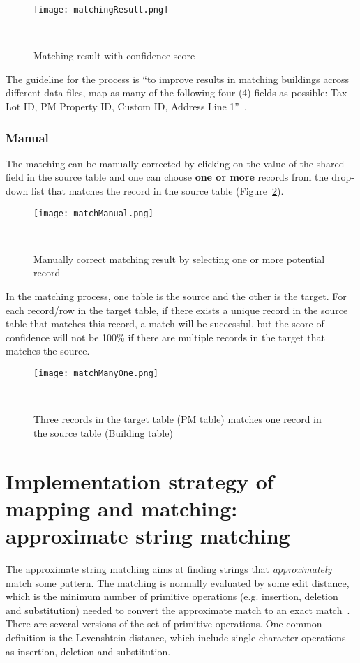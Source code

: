 \documentclass[12pt]{article}
\newcommand{\fref}[1]{Figure~\ref{#1}}
\begin{document}
\begin{figure}[h!]
  \centering
  \texttt{[image: matchingResult.png]}
  \caption{Matching result with confidence
    score}~\cite{SEEDWebpage2015}
  \label{fig:matchingResult}
\end{figure}

The guideline for the process is ``to improve results in matching
buildings across different data files, map as many of the following
four (4) fields as possible: Tax Lot ID, PM Property ID, Custom ID,
Address Line 1''~\cite{SEEDWebpage2015}.

\subsubsection{Manual}
The matching can be manually corrected by clicking on the value of the
shared field in the source table and one can choose \textbf{one or
  more} records from the drop-down list that matches the record in the
source table (\fref{fig:matchManual}).

\begin{figure}[h!]
  \centering
  \texttt{[image: matchManual.png]}
  \caption{Manually correct matching result by selecting one or more
    potential record}~\cite{SEEDWebpage2015}
  \label{fig:matchManual}
\end{figure}

In the matching process, one table is the source and the other is the
target. For each record/row in the target table, if there exists a
unique record in the source table that matches this record, a match
will be successful, but the score of confidence will not be 100\% if
there are multiple records in the target that matches the source.

\begin{figure}[h!]
  \centering
  \texttt{[image: matchManyOne.png]}
  \caption{Three records in the target table (PM table) matches one
    record in the source table (Building table)}~\cite{SEEDWebpage2015}
  \label{fig:matchManyOne}
\end{figure}

\section{Implementation strategy of mapping and matching: approximate
  string matching}
The approximate string matching aims at finding strings that
\emph{approximately} match some pattern. The matching is normally
evaluated by some edit distance, which is the minimum number of
primitive operations (e.g. insertion, deletion and substitution)
needed to convert the approximate match to an exact
match~\cite{approxStringMatchWiki}. There are several versions of the
set of primitive operations. One common definition is the Levenshtein
distance, which include single-character operations as insertion,
deletion and substitution.
\end{document}
